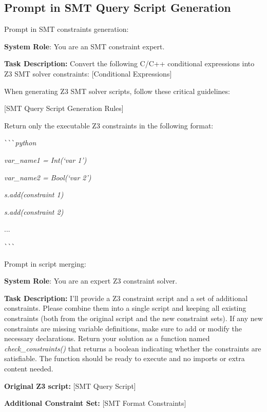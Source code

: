 \subsection{Prompt in SMT Query Script Generation}


Prompt in SMT constraints generation:

\begin{mdframed}
[linecolor=myblue!50,linewidth=2pt,roundcorner=10pt,backgroundcolor=myyellow!20]
\small

\hspace{3.5mm} \textbf{System Role}: You are an SMT constraint expert. 

\textbf{Task Description:} 
Convert the following C/C++ conditional expressions into Z3 SMT solver constraints: 
[Conditional Expressions]

When generating Z3 SMT solver scripts, follow these critical guidelines:

[SMT Query Script Generation Rules]


Return only the executable Z3 constraints in the following format:

\verb|```|\textit{python} 

\textit{var\_name1 = Int(`var 1')}

\textit{var\_name2 = Bool(`var 2')}

\textit{s.add(constraint 1)}

\textit{s.add(constraint 2)} 

...

\verb|```|

\end{mdframed}

Prompt in script merging:

\begin{mdframed}
[linecolor=myblue!50,linewidth=2pt,roundcorner=10pt,backgroundcolor=myyellow!20]
\small

\hspace{3.5mm} \textbf{System Role}: You are an expert Z3 constraint solver. 

\textbf{Task Description:} 
I'll provide a Z3 constraint script and a set of additional constraints. Please combine them into a single script and keeping all existing constraints (both from the original script and the new constraint sets). If any new constraints are missing variable definitions, make sure to add or modify the necessary declarations.
Return your solution as a function named \textit{check\_constraints()} that returns a boolean indicating whether the constraints are satisfiable. The function should be ready to execute and no imports or extra content needed.

\textbf{Original Z3 script:} [SMT Query Script]

\textbf{Additional Constraint Set:} [SMT Format Constraints]


\end{mdframed}

